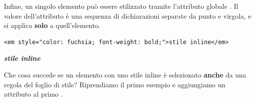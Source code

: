 Infine, un singolo elemento può essere stilizzato  tramite
l'attributo globale . Il valore dell'attributo è una sequenza di
dichiarazioni separate da punto e virgola, e si applica \textbf{solo} a
quell'elemento.

\begin{affianco}[0.62]
\begin{lstlisting}[style=html, name=stile inline]
<em style="color: fuchsia; font-weight: bold;">stile inline</em>
\end{lstlisting}
\risultato
\begin{browser}
  \textcolor{css-fuchsia}{\textbf{\textit{stile inline}}}
\end{browser}
\end{affianco}

Che cosa succede se un elemento con uno stile inline è selezionato
\textbf{anche} da una regola del foglio di stile? Riprendiamo il primo esempio e
aggiungiamo un attributo  al primo .

